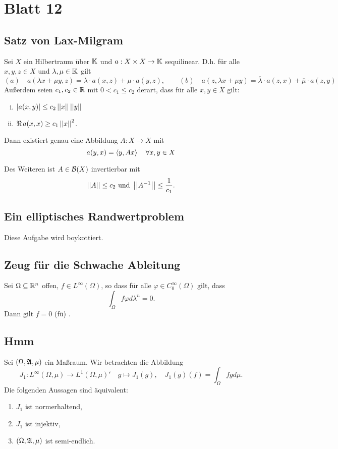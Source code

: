 \documentclass[FunkAnaSkriptSS2017.tex]{subfiles} %
\begin{document}
\newpage 
\section{ Blatt 12}


\subsection{ Satz von Lax-Milgram}
	Sei $X$ ein Hilbertraum über $\mathbb{K}$ und $a : X \times X \to \mathbb{K}$ sequilinear. D.h. für alle $x,y,z \in X$ und $\lambda,\mu \in\mathbb{K}$ gilt
	 $$ (a)\quad a(\lambda x + \mu y ,z) = \lambda \cdot a(x,z) + \mu \cdot a(y,z),\qquad
		(b)\quad a(z, \lambda x + \mu y ) = \overline{\lambda} \cdot a(z,x) + \overline{\mu} \cdot a(z,y)$$
	Außerdem seien $c_1, c_2 \in \mathbb{R}$ mit $0< c_1 \leq c_2$ derart, dass für alle $x,y \in X$ gilt:
	\begin{enumerate}[(i)]
	\item $\left\lvert a(x,y) \right\rvert \leq c_2 \left\lvert \left\lvert x \right\rvert \right\rvert \left\lvert \left\lvert y \right\rvert \right\rvert$
	\item $\Re \, a(x,x) \geq c_1 \left\lvert \left\lvert x \right\rvert \right\rvert^2$.
	\end{enumerate}
	
	Dann existiert genau eine Abbildung $A: X\to X$ mit
	$$a(y,x) = \left \langle y,Ax \right \rangle \quad \forall x,y \in X$$
	
	Des Weiteren ist $A \in \mathcal{B}(X)$ invertierbar mit
	$$\left\lvert \left\lvert A \right\rvert \right\rvert \leq c_2 \text{ und } \left\lvert \left\lvert A^{-1} \right\rvert \right\rvert \leq \frac{1}{c_1}.$$	 
	
	

\subsection{ Ein elliptisches Randwertproblem}
	Diese Aufgabe wird boykottiert.
	

\subsection{ Zeug für die Schwache Ableitung}
	Sei $\Omega \subseteq \mathbb{R}^n$ offen, $f \in L^\infty (\Omega)$, so dass für alle $\varphi \in C^\infty_0 (\Omega)$ gilt, dass
	$$ \int_\Omega f \varphi d\lambda^n = 0 .$$
	Dann gilt $f = 0$ (fü) .
	

\subsection{ Hmm}
	Sei $(\Omega, \mathfrak{A}, \mu )$ ein Maßraum. Wir  betrachten die Abbildung
	$$ J_1: L^\infty (\Omega, \mu ) \to L^1 (\Omega , \mu)'  \quad g \mapsto J_1(g), \quad J_1(g)(f) = \int_\Omega fg d\mu .$$
	Die folgenden Aussagen sind äquivalent:
	\begin{enumerate}
		\item $J_1$ ist normerhaltend,
		\item $J_1$ ist injektiv,
		\item $(\Omega, \mathfrak{A} , \mu ) $ ist semi-endlich.
	\end{enumerate}
\end{document}
